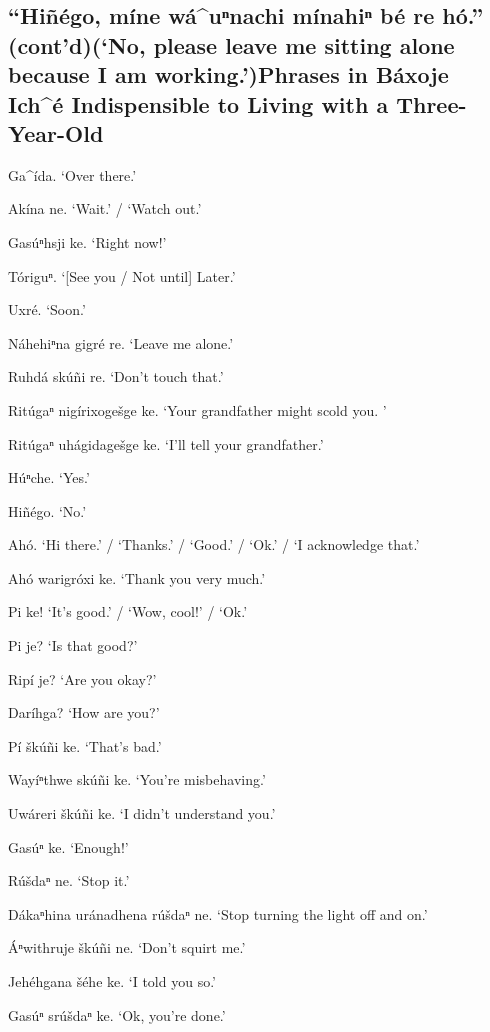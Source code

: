 \documentclass[output=paper]{LSP/langsci}
\begin{document}
\subsection*{``Hiñégo, míne wá\^{ }uⁿnachi mínahiⁿ bé re hó.'' (cont'd)\newline (`No, please leave me sitting alone because I am working.')\newline Phrases in Báxoje Ich\^{ }é Indispensible to Living with a Three-Year-Old}
\begin{list}{}{} \itemsep1pt \parskip0pt 
\item{Ga\^{ }ída. `Over there.'}
\item{Akína ne.	`Wait.' / `Watch out.'}
\item{Gasúⁿhsji ke. `Right now!'  }
\item{Tóriguⁿ.	`[See you / Not until] Later.'}
\item{Uxré. `Soon.'}
\item{Náhehiⁿna gigré re. `Leave me alone.'}
\item{Ruhdá skúñi re. `Don't touch that.'}
\item{Ritúgaⁿ nigírixogešge ke. `Your grandfather might scold you. '}
\item{Ritúgaⁿ uhágidagešge ke. `I'll tell your grandfather.'}
\item{}
\item{Húⁿche.	`Yes.'}
\item{Hiñégo. `No.'}
\item{Ahó.	`Hi there.' / `Thanks.' / `Good.' / `Ok.' / `I acknowledge that.'}
\item{Ahó warigróxi ke. `Thank you very much.'}
\item{Pi ke! `It's good.' / `Wow, cool!' / `Ok.'}
\item{Pi je? `Is that good?'}
\item{Ripí je? `Are you okay?'}
\item{Daríhga? `How are you?'}
\item{Pí škúñi ke. `That's bad.'}
\item{Wayíⁿthwe skúñi ke. `You're misbehaving.'}
\item{Uwáreri škúñi ke. `I didn't understand you.'}
\item{Gasúⁿ ke. `Enough!'}
\item{Rúšdaⁿ ne. `Stop it.'}
\item{Dákaⁿhina uránadhena rúšdaⁿ ne. `Stop turning the light off and on.'}
\item{\'Aⁿwithruje škúñi ne. `Don't squirt me.'}
\item{}
\item{Jehéhgana šéhe ke. `I told you so.'}
\item{Gasúⁿ srúšdaⁿ ke. `Ok, you're done.'}
\end{list} 
\end{document}
